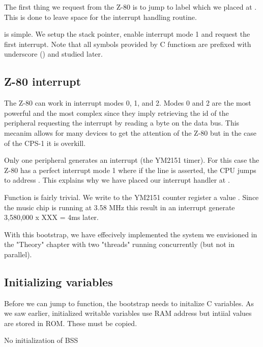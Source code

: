 The first thing we request from the Z-80 is to jump to label  which we placed at . This is done to leave space for the interrupt handling routine.

 is simple. We setup the stack pointer, enable interrupt mode 1 and request the first interrupt. Note that all symbols provided by C functiosn are prefixed with underscore (\icode{\_}) and studied later.

\subsection{Z-80 interrupt}
The Z-80 can work in interrupt modes 0, 1, and 2. Modes 0 and 2 are the most powerful and the most complex since they imply retrieving the id of the peripheral requesting the interrupt by reading a byte on the data bus. This mecanim allows for many devices to get the attention of the Z-80 but in the case of the CPS-1 it is overkill. 

Only one peripheral generates an interrupt (the YM2151 timer). For this case the Z-80 has a perfect interrupt mode 1 where if the  line is asserted, the CPU jumps to address . This explains why we have placed our interrupt handler at .




Function  is fairly trivial. We write to the YM2151 counter register a value . Since the music chip is running at 3.58 MHz this result in an interrupt generate 3,580,000 x XXX = 4ms later.

With this bootstrap, we have effecively implemented the system we envisioned in the "Theory" chapter with two "threads" running concurrently (but not in parallel).

\subsection{Initializing variables}
Before we can jump to  function, the bootstrap needs to initalize C variables. As we saw earlier, initialized writable variables use RAM address but intiial values are stored in ROM. These must be copied.






No initialization of BSS

